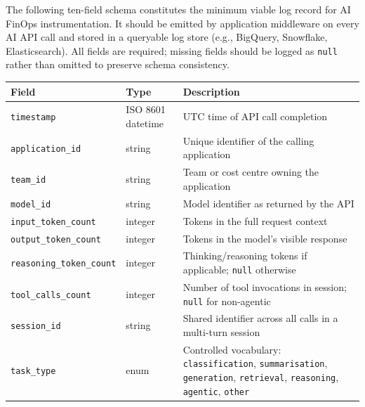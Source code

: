 \documentclass[11pt,twocolumn]{article}
\begin{document}
The following ten-field schema constitutes the minimum viable log record for AI
FinOps instrumentation. It should be emitted by application middleware on every
AI API call and stored in a queryable log store (e.g., BigQuery, Snowflake,
Elasticsearch). All fields are required; missing fields should be logged as
\texttt{null} rather than omitted to preserve schema consistency.

\vspace{6pt}
\begin{tabular}{llp{8cm}}
\toprule
\textbf{Field} & \textbf{Type} & \textbf{Description} \\
\midrule
\texttt{timestamp}              & ISO 8601 datetime & UTC time of API call completion \\
\texttt{application\_id}        & string            & Unique identifier of the calling application \\
\texttt{team\_id}               & string            & Team or cost centre owning the application \\
\texttt{model\_id}              & string            & Model identifier as returned by the API \\
\texttt{input\_token\_count}    & integer           & Tokens in the full request context \\
\texttt{output\_token\_count}   & integer           & Tokens in the model's visible response \\
\texttt{reasoning\_token\_count}& integer           & Thinking/reasoning tokens if applicable; \texttt{null} otherwise \\
\texttt{tool\_calls\_count}     & integer           & Number of tool invocations in session; \texttt{null} for non-agentic \\
\texttt{session\_id}            & string            & Shared identifier across all calls in a multi-turn session \\
\texttt{task\_type}             & enum              & Controlled vocabulary: \texttt{classification}, \texttt{summarisation}, \texttt{generation}, \texttt{retrieval}, \texttt{reasoning}, \texttt{agentic}, \texttt{other} \\
\bottomrule
\end{tabular}
\end{document}
